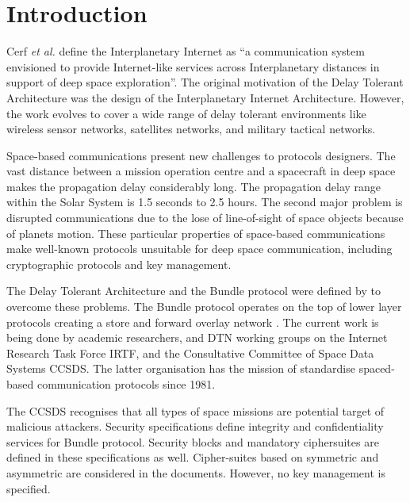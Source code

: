 \section{Introduction}

Cerf \textit{et al.} \cite{cerf2007delay} define the Interplanetary Internet as ``a communication system envisioned to provide Internet-like services across Interplanetary distances in support of deep space exploration''. The original motivation of the Delay Tolerant Architecture was the design of the Interplanetary Internet Architecture. However, the work evolves to cover a wide range of delay tolerant environments like wireless sensor networks, satellites networks, and military tactical networks. 

Space-based communications present new challenges to protocols designers.  The vast distance between a mission operation centre and a spacecraft in deep space makes the propagation delay considerably long. The propagation delay range within the Solar System is 1.5 seconds to  2.5 hours. The second major problem is disrupted communications due to the lose of line-of-sight of space objects because of planets motion. These particular properties of space-based communications make well-known protocols unsuitable for deep space communication, including cryptographic protocols and key management. 


The Delay Tolerant Architecture \cite{cerf2007delay} and the Bundle protocol \cite{scott2007bundle} were defined by to overcome these problems. The Bundle protocol operates on the top of lower layer protocols creating a store and forward overlay network \cite{ivancic2009security}. The current work is being done by academic researchers, and DTN working groups on the Internet Research Task Force IRTF, and the Consultative Committee of Space Data Systems CCSDS. The latter organisation has the mission of standardise spaced-based communication protocols since 1981.


The CCSDS recognises that all types of space missions are potential target of malicious attackers.  Security specifications \cite{ietf-dtn-bibect-00,ietf-dtn-bpsec-07,rfc6257} define integrity and confidentiality services for Bundle protocol. Security blocks and mandatory ciphersuites are defined in these specifications as well.  Cipher-suites based on symmetric and asymmetric are considered in the documents. However, no key management is specified.   

